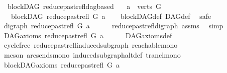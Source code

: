 \begin{isabellebody}
\isanewline
{}\isamarkupfalse%
\ {\isacharparenleft}{\kern0pt}\ blockDAG{\isacharparenright}{\kern0pt}\ reduce{\isacharunderscore}{\kern0pt}past{\isacharunderscore}{\kern0pt}refl{\isacharunderscore}{\kern0pt}dagbased{\isacharcolon}{\kern0pt}\isanewline
\ \ \ {\isachardoublequoteopen}a\ {\isasymin}\ verts\ G{\isachardoublequoteclose}\isanewline
\ \ \ {\isachardoublequoteopen}blockDAG\ {\isacharparenleft}{\kern0pt}reduce{\isacharunderscore}{\kern0pt}past{\isacharunderscore}{\kern0pt}refl\ G\ a{\isacharparenright}{\kern0pt}{\isachardoublequoteclose}\isanewline
%
\isadelimproof
\ \ %
\endisadelimproof
%
\isatagproof
{}\isamarkupfalse%
\ blockDAG{\isacharunderscore}{\kern0pt}def\ DAG{\isacharunderscore}{\kern0pt}def\ \isanewline
{}\isamarkupfalse%
\ safe\isanewline
\ \ \isamarkupfalse%
\ {\isachardoublequoteopen}digraph\ {\isacharparenleft}{\kern0pt}reduce{\isacharunderscore}{\kern0pt}past{\isacharunderscore}{\kern0pt}refl\ G\ a{\isacharparenright}{\kern0pt}{\isachardoublequoteclose}\isanewline
\ \ \ \ \isamarkupfalse%
\ reduce{\isacharunderscore}{\kern0pt}past{\isacharunderscore}{\kern0pt}refl{\isacharunderscore}{\kern0pt}digraph\ assms{\isacharparenleft}{\kern0pt}{}{\isacharparenright}{\kern0pt}\ \isamarkupfalse%
\ simp\isanewline
{}\isamarkupfalse%
\isanewline
\ \ \isamarkupfalse%
\ {\isachardoublequoteopen}DAG{\isacharunderscore}{\kern0pt}axioms\ {\isacharparenleft}{\kern0pt}reduce{\isacharunderscore}{\kern0pt}past{\isacharunderscore}{\kern0pt}refl\ G\ a{\isacharparenright}{\kern0pt}{\isachardoublequoteclose}\isanewline
\ \ \ \ \isamarkupfalse%
\ DAG{\isacharunderscore}{\kern0pt}axioms{\isacharunderscore}{\kern0pt}def\isanewline
\ \ \ \ \isamarkupfalse%
\ cycle{\isacharunderscore}{\kern0pt}free\ reduce{\isacharunderscore}{\kern0pt}past{\isacharunderscore}{\kern0pt}refl{\isacharunderscore}{\kern0pt}induced{\isacharunderscore}{\kern0pt}subgraph\ reachable{\isacharunderscore}{\kern0pt}mono\isanewline
\ \ \ \ \isamarkupfalse%
\ {\isacharparenleft}{\kern0pt}meson\ arcs{\isacharunderscore}{\kern0pt}ends{\isacharunderscore}{\kern0pt}mono\ induced{\isacharunderscore}{\kern0pt}subgraph{\isacharunderscore}{\kern0pt}altdef\ trancl{\isacharunderscore}{\kern0pt}mono{\isacharparenright}{\kern0pt}\ \isanewline
{}\isamarkupfalse%
\isanewline
\ \ \isamarkupfalse%
\ {\isachardoublequoteopen}blockDAG{\isacharunderscore}{\kern0pt}axioms\ {\isacharparenleft}{\kern0pt}reduce{\isacharunderscore}{\kern0pt}past{\isacharunderscore}{\kern0pt}refl\ G\ a{\isacharparenright}{\kern0pt}{\isachardoublequoteclose}\isanewline

\end{isabellebody}
